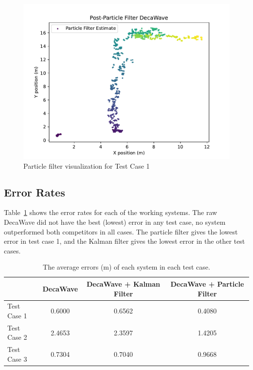 \begin{figure}
	\center
	\includegraphics[width=\linewidth]{./images/particle_filter_test1.pdf}
	\caption{Particle filter visualization for Test Case 1}
	\label{figure:particle_filter_1}
\end{figure}

\subsection{Error Rates}

Table~\ref{table:error_rates} shows the error rates for each of the working systems.
The raw DecaWave did not have the best (lowest) error in any test case, no system outperformed
both competitors in all cases.
The particle filter gives the lowest error in test case 1, and the Kalman filter gives the lowest
error in the other test cases.

\begin{table}
	\centering
	\begin{tabular}{|l|c|c|c|}
	\hline
			& DecaWave & DecaWave + Kalman Filter & DecaWave + Particle Filter \\\hline
	Test Case 1 	& 0.6000 & 0.6562 & 0.4080 \\\hline
	Test Case 2	& 2.4653 & 2.3597 & 1.4205 \\\hline
	Test Case 3	& 0.7304 & 0.7040 & 0.9668 \\\hline
	\end{tabular}
	\caption{The average errors (m) of each system in each test case.}
	\label{table:error_rates}
\end{table}


